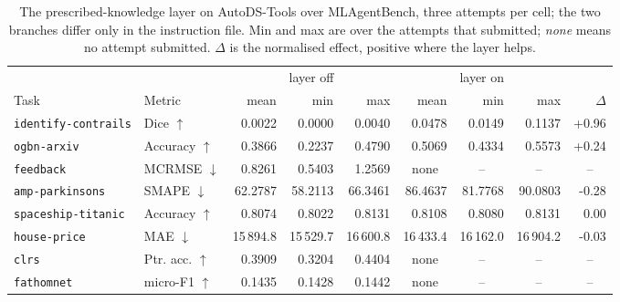 \begin{table}[!t]
\centering
\caption{The prescribed-knowledge layer on AutoDS-Tools over MLAgentBench, three attempts per cell; the two branches differ only in the instruction file. Min and max are over the attempts that submitted; \emph{none} means no attempt submitted. $\Delta$ is the normalised effect, positive where the layer helps.}
\label{tab:ktool}
\small
\setlength{\tabcolsep}{5pt}
\begin{tabular}{llrrrrrrr}
\toprule
 & & \multicolumn{3}{c}{layer off} & \multicolumn{3}{c}{layer on} & \\
\cmidrule(lr){3-5}\cmidrule(lr){6-8}
Task & Metric & mean & min & max & mean & min & max & $\Delta$ \\
\midrule
\texttt{identify-contrails} & Dice $\uparrow$ & 0.0022 & 0.0000 & 0.0040 & 0.0478 & 0.0149 & 0.1137 & +0.96 \\
\texttt{ogbn-arxiv} & Accuracy $\uparrow$ & 0.3866 & 0.2237 & 0.4790 & 0.5069 & 0.4334 & 0.5573 & +0.24 \\
\texttt{feedback} & MCRMSE $\downarrow$ & 0.8261 & 0.5403 & 1.2569 & \multicolumn{1}{c}{none} & \multicolumn{1}{c}{--} & \multicolumn{1}{c}{--} & \multicolumn{1}{c}{--} \\
\texttt{amp-parkinsons} & SMAPE $\downarrow$ & 62.2787 & 58.2113 & 66.3461 & 86.4637 & 81.7768 & 90.0803 & -0.28 \\
\texttt{spaceship-titanic} & Accuracy $\uparrow$ & 0.8074 & 0.8022 & 0.8131 & 0.8108 & 0.8080 & 0.8131 & 0.00 \\
\texttt{house-price} & MAE $\downarrow$ & 15\,894.8 & 15\,529.7 & 16\,600.8 & 16\,433.4 & 16\,162.0 & 16\,904.2 & -0.03 \\
\texttt{clrs} & Ptr. acc. $\uparrow$ & 0.3909 & 0.3204 & 0.4404 & \multicolumn{1}{c}{none} & \multicolumn{1}{c}{--} & \multicolumn{1}{c}{--} & \multicolumn{1}{c}{--} \\
\texttt{fathomnet} & micro-F1 $\uparrow$ & 0.1435 & 0.1428 & 0.1442 & \multicolumn{1}{c}{none} & \multicolumn{1}{c}{--} & \multicolumn{1}{c}{--} & \multicolumn{1}{c}{--} \\
\bottomrule
\end{tabular}
\end{table}
